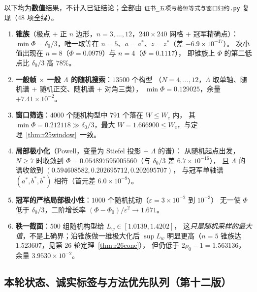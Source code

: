 \documentclass[UTF8,11pt]{ctexart}
\theoremstyle{definition}
\newcommand{\Lam}{\Lambda}
\begin{document}
以下均为\textbf{数值}结果，不计入已证结论；全部由
\texttt{证书\_五项亏格恒等式与窗口归约.py} 复现（$48$ 项全绿）。
\begin{enumerate}\itemsep2pt
\item \textbf{锥族}（极点 $+$ 正 $n$ 边形，$n=3,\dots,12$，$240\times240$ 网格 $+$ 冠军精确点）：
$\min\Phi=\delta_0/3$，唯一取等在 $n=5$、$a=a^*$、$z=z^*$（差 $-6.9\times10^{-17}$）。
次小值出现在 $n=8$（$\Phi=0.0979$）与 $n=4$（$\Phi=0.1117$），
即锥族上 $\Phi$ 的第二低点比 $\delta_0/3$ 高 $78\%$。
\item \textbf{一般帧 $\times$ 一般 $\Lam$ 的随机搜索}：$13500$ 个构型
（$N=4,\dots,12$，$\Lam$ 取单轴、随机谱 $+$ 随机正交、随机谱 $+$ 对角三类），
$\min\Phi=0.129025$，余量 $+7.41\times10^{-2}$。
\item \textbf{窗口筛选}：$4000$ 个随机构型中 $791$ 个落在 $W\le W_c$ 内，
其 $\min\Phi=0.212118\gg\delta_0/3$，最大 $W=1.666900\le W_c$，与定理~\ref{thm:r25window}~一致。
\item \textbf{局部极小化}（Powell，变量为 Stiefel 投影 $+$ $\Lam$ 的谱）：
从随机起点出发，$N\ge7$ 时收敛到 $\Phi=0.054897595005560$（与 $\delta_0/3$ 差 $6.7\times10^{-16}$），
且 $\Lam$ 的谱收敛到 $(0.594608582,0.202695712,0.202695707)$，
与冠军单轴谱 $(a^*,b^*,b^*)$ 相符（首元差 $6.0\times10^{-9}$）。
\item \textbf{冠军的严格局部极小性}：$1000$ 个随机扰动（$\varepsilon=3\times10^{-2}$ 到 $10^{-3}$）
无一使 $\Phi$ 低于 $\delta_0/3$，二阶增长率 $(\Phi-\Phi_0)/\varepsilon^2\to1.671$。
\item \textbf{秩一截面}：$500$ 组随机构型给 $L_w\in[1.0139,1.4202]$，
这\emph{只是随机采样的最大值}，不是上确界；沿锥族做一维极大化后
$\sup L_w$ 明显更高（$n=5$ 锥族达 $1.523607$，见第 26 轮定理~\ref{thm:r26cone}），
但仍低于 $2\rho_0-1=1.563136$，余量 $3.9530\times10^{-2}$。
\end{enumerate}

\subsection{本轮状态、诚实标签与方法优先队列（第十二版）}\label{sec:r25:status}
\end{document}

